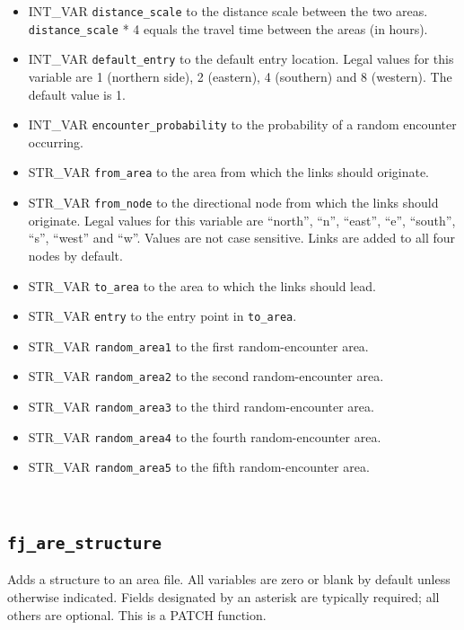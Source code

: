 \documentclass{article}
\def\DEFINE#1{{\tt \bf #1}\label{#1}\index{#1}}
\begin{document}
\begin{itemize}
\item INT_VAR \verb+distance_scale+ to the distance scale between the two areas. \verb+distance_scale+ * 4 equals the travel time between the areas (in hours).
\item INT_VAR \verb+default_entry+ to the default entry location. Legal values for this variable are 1 (northern side), 2 (eastern), 4 (southern) and 8 (western). The default value is 1.
\item INT_VAR \verb+encounter_probability+ to the probability of a random encounter occurring.
\item STR_VAR \verb+from_area+ to the area from which the links should originate.
\item STR_VAR \verb+from_node+ to the directional node from which the links should originate. Legal values for this variable are ``north'', ``n'', ``east'', ``e'', ``south'', ``s'', ``west'' and ``w''. Values are not case sensitive. Links are added to all four nodes by default.
\item STR_VAR \verb+to_area+ to the area to which the links should lead.
\item STR_VAR \verb+entry+ to the entry point in \verb+to_area+.
\item STR_VAR \verb+random_area1+ to the first random-encounter area.
\item STR_VAR \verb+random_area2+ to the second random-encounter area.
\item STR_VAR \verb+random_area3+ to the third random-encounter area.
\item STR_VAR \verb+random_area4+ to the fourth random-encounter area.
\item STR_VAR \verb+random_area5+ to the fifth random-encounter area.
\end{itemize}
\\

\subsection{\DEFINE{fj_are_structure}}
Adds a structure to an area file. All variables are zero or blank by default unless otherwise indicated. Fields designated by an asterisk are typically required; all others are optional.
This is a PATCH function.
\end{document}
